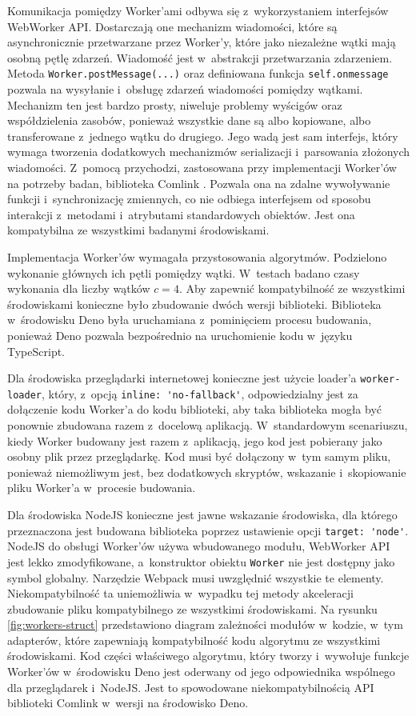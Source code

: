 Komunikacja pomiędzy Worker'ami odbywa się z~wykorzystaniem interfejsów WebWorker API. Dostarczają one mechanizm wiadomości, które są asynchronicznie przetwarzane przez Worker'y, które jako niezależne wątki mają osobną pętlę zdarzeń. Wiadomość jest w~abstrakcji przetwarzania zdarzeniem. Metoda \lstinline{Worker.postMessage(...)} oraz definiowana funkcja \lstinline{self.onmessage} pozwala na wysyłanie i~obsługę zdarzeń wiadomości pomiędzy wątkami. Mechanizm ten jest bardzo prosty, niweluje problemy wyścigów oraz współdzielenia zasobów, ponieważ wszystkie dane są albo kopiowane, albo transferowane z~jednego wątku do drugiego. Jego wadą jest sam interfejs, który wymaga tworzenia dodatkowych mechanizmów serializacji i~parsowania złożonych wiadomości. Z~pomocą przychodzi, zastosowana przy implementacji Worker'ów na potrzeby badan, biblioteka Comlink \cite{comlink}. Pozwala ona na zdalne wywoływanie funkcji i~synchronizację zmiennych, co nie odbiega interfejsem od sposobu interakcji z~metodami i~atrybutami standardowych obiektów. Jest ona kompatybilna ze wszystkimi badanymi środowiskami. 

Implementacja Worker'ów wymagała przystosowania algorytmów. Podzielono wykonanie głównych ich pętli pomiędzy wątki. W~testach badano czasy wykonania dla liczby wątków $c=4$. Aby zapewnić kompatybilność ze wszystkimi środowiskami konieczne było zbudowanie dwóch wersji biblioteki. Biblioteka w~środowisku Deno była uruchamiana z~pominięciem procesu budowania, ponieważ Deno pozwala bezpośrednio na uruchomienie kodu w~języku TypeScript. 

Dla środowiska przeglądarki internetowej konieczne jest użycie loader'a \lstinline{worker-loader}, który, z~opcją \lstinline{inline: 'no-fallback'}, odpowiedzialny jest za dołączenie kodu Worker'a do kodu biblioteki, aby taka biblioteka mogła być ponownie zbudowana razem z~docelową aplikacją. W~standardowym scenariuszu, kiedy Worker budowany jest razem z~aplikacją, jego kod jest pobierany jako osobny plik przez przeglądarkę. Kod musi być dołączony w~tym samym pliku, ponieważ niemożliwym jest, bez dodatkowych skryptów, wskazanie i~skopiowanie pliku Worker'a w~procesie budowania.

Dla środowiska NodeJS konieczne jest jawne wskazanie środowiska, dla którego przeznaczona jest budowana biblioteka poprzez ustawienie opcji \lstinline{target: 'node'}. NodeJS do obsługi Worker'ów używa wbudowanego modułu, WebWorker API jest lekko zmodyfikowane, a~konstruktor obiektu \lstinline{Worker} nie jest dostępny jako symbol globalny. Narzędzie Webpack musi uwzględnić wszystkie te elementy. Niekompatybilność ta uniemożliwia w~wypadku tej metody akceleracji zbudowanie pliku kompatybilnego ze wszystkimi środowiskami. Na rysunku \ref{fig:workers-struct} przedstawiono diagram zależności modułów w~kodzie, w~tym adapterów, które zapewniają kompatybilność kodu algorytmu ze wszystkimi środowiskami. Kod części właściwego algorytmu, który tworzy i~wywołuje funkcje Worker'ów w~środowisku Deno jest oderwany od jego odpowiednika wspólnego dla przeglądarek i~NodeJS. Jest to spowodowane niekompatybilnością API biblioteki Comlink w~wersji na środowisko Deno.


